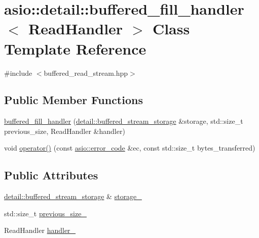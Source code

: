 \hypertarget{classasio_1_1detail_1_1buffered__fill__handler}{}\section{asio\+:\+:detail\+:\+:buffered\+\_\+fill\+\_\+handler$<$ Read\+Handler $>$ Class Template Reference}
\label{classasio_1_1detail_1_1buffered__fill__handler}


{\ttfamily \#include $<$buffered\+\_\+read\+\_\+stream.\+hpp$>$}

\subsection*{Public Member Functions}
\begin{DoxyCompactItemize}
\item 
\hyperlink{classasio_1_1detail_1_1buffered__fill__handler_a8b7c319d78e941cf98cd53fd6b80b71b}{buffered\+\_\+fill\+\_\+handler} (\hyperlink{classasio_1_1detail_1_1buffered__stream__storage}{detail\+::buffered\+\_\+stream\+\_\+storage} \&storage, std\+::size\+\_\+t previous\+\_\+size, Read\+Handler \&handler)
\item 
void \hyperlink{classasio_1_1detail_1_1buffered__fill__handler_ac314c528b751b53fed6d485532d28019}{operator()} (const \hyperlink{classasio_1_1error__code}{asio\+::error\+\_\+code} \&ec, const std\+::size\+\_\+t bytes\+\_\+transferred)
\end{DoxyCompactItemize}
\subsection*{Public Attributes}
\begin{DoxyCompactItemize}
\item 
\hyperlink{classasio_1_1detail_1_1buffered__stream__storage}{detail\+::buffered\+\_\+stream\+\_\+storage} \& \hyperlink{classasio_1_1detail_1_1buffered__fill__handler_a72f7cbdd99e8f826677509495865484f}{storage\+\_\+}
\item 
std\+::size\+\_\+t \hyperlink{classasio_1_1detail_1_1buffered__fill__handler_aa02fc3d81409dab3abca8936143d61d9}{previous\+\_\+size\+\_\+}
\item 
Read\+Handler \hyperlink{classasio_1_1detail_1_1buffered__fill__handler_a539a4807928b17449322328e0c43c7a9}{handler\+\_\+}
\end{DoxyCompactItemize}


